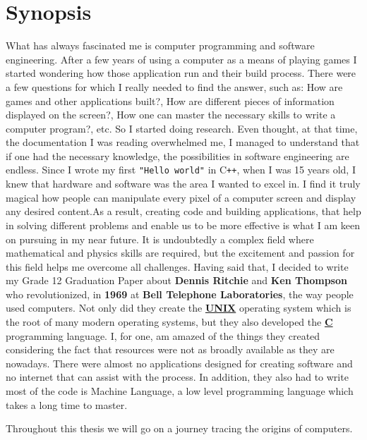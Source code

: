 \documentclass[12pt]{article}
\begin{document}
\section{Synopsis}
What has always fascinated me is computer programming and software engineering. After a few years of using a computer as a means of playing games I started wondering how those application run and their build process. There were a few questions for which I really needed to find the answer, such as: How are games and other applications built?, How are different pieces of information displayed on the screen?, How one can master the necessary skills to write a computer program?, etc. So I started doing research. Even thought, at that time, the documentation I was reading overwhelmed me, I managed to understand that if one had the necessary knowledge, the possibilities in software engineering are endless. Since I wrote my first \verb|"Hello world"| in C\texttt{++}, when I was 15 years old, I knew that hardware and software was the area I wanted to excel in. I find it truly magical how people can manipulate every pixel of a computer screen and display any desired content.\newline\newline As a result, creating code and building applications, that help in solving different problems and enable us to be more effective is what I am keen on pursuing in my near future. It is undoubtedly a complex field where mathematical and physics skills are required, but the excitement and passion for this field helps me overcome all challenges. \newline\newline Having said that, I decided to write my Grade 12 Graduation Paper about \textbf{Dennis Ritchie} and \textbf{Ken Thompson} who revolutionized, in \textbf{1969} at \textbf{Bell Telephone Laboratories}, the way people used computers. Not only did they create the \underline{\textbf{UNIX}} operating system which is the root of many modern operating systems, but they also developed the \underline{\textbf{C}} programming language. I, for one, am amazed of the things they created considering the fact that resources were not as broadly available as they are nowadays. There were almost no applications designed for creating software and no internet that can assist with the process. In addition, they also had to write most of the code is Machine Language, a low level programming language which takes a long time to master.\newline
\begin{center}
    Throughout this thesis we will go on a journey tracing the origins of computers.
\end{center}
\end{document}
